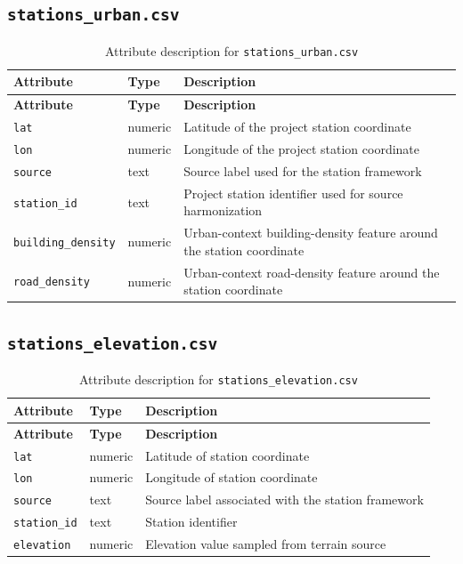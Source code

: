 \documentclass[12pt,a4paper]{report}
\begin{document}
\subsection{\texttt{stations\_urban.csv}}
\begin{longtable}{L{3cm}L{2cm}L{8.6cm}}
\caption{Attribute description for \texttt{stations\_urban.csv}}\\
\toprule
\textbf{Attribute} & \textbf{Type} & \textbf{Description} \\
\midrule
\endfirsthead
\toprule
\textbf{Attribute} & \textbf{Type} & \textbf{Description} \\
\midrule
\endhead
\texttt{lat} & numeric & Latitude of the project station coordinate \\
\texttt{lon} & numeric & Longitude of the project station coordinate \\
\texttt{source} & text & Source label used for the station framework \\
\texttt{station\_id} & text & Project station identifier used for source harmonization \\
\texttt{building\_density} & numeric & Urban-context building-density feature around the station coordinate \\
\texttt{road\_density} & numeric & Urban-context road-density feature around the station coordinate \\
\bottomrule
\end{longtable}

\subsection{\texttt{stations\_elevation.csv}}
\begin{longtable}{L{3cm}L{2cm}L{8.6cm}}
\caption{Attribute description for \texttt{stations\_elevation.csv}}\\
\toprule
\textbf{Attribute} & \textbf{Type} & \textbf{Description} \\
\midrule
\endfirsthead
\toprule
\textbf{Attribute} & \textbf{Type} & \textbf{Description} \\
\midrule
\endhead
\texttt{lat} & numeric & Latitude of station coordinate \\
\texttt{lon} & numeric & Longitude of station coordinate \\
\texttt{source} & text & Source label associated with the station framework \\
\texttt{station\_id} & text & Station identifier \\
\texttt{elevation} & numeric & Elevation value sampled from terrain source \\
\bottomrule
\end{longtable}
\end{document}
